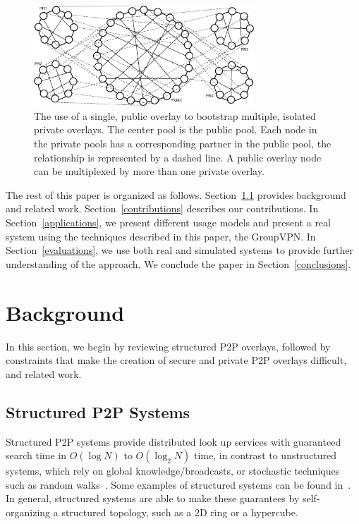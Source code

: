 \documentclass[conference]{IEEEtran}
\begin{document}
\begin{figure}[h]
\centering
\includegraphics[width=3.25in]{subrings.eps}
\caption{The use of a single, public overlay to bootstrap multiple, isolated
private overlays.  The center pool is the public pool.  Each node in the
private pools has a corresponding partner in the public pool, the relationship
is represented by a dashed line.  A public overlay node can be multiplexed by
more than one private overlay.}
\label{fig:subrings}
\end{figure}

The rest of this paper is organized as follows.  Section~\ref{structured_p2p}
provides background and related work.
Section~\ref{contributions} describes our contributions.  In
Section~\ref{applications}, we present different usage models and present a
real system using the techniques described in this paper, the GroupVPN.  In
Section~\ref{evaluations}, we use both real and simulated systems to provide
further understanding of the approach.  We conclude the paper in
Section~\ref{conclusions}.

\section{Background}
\label{background}
In this section, we begin by reviewing structured P2P overlays, followed by
constraints that make the creation of secure and private P2P overlays
difficult, and related work.

\subsection{Structured P2P Systems}
\label{structured_p2p}
Structured P2P systems provide distributed look up services with guaranteed
search time in $O(\log N)$ to $O(\log_2 N)$ time, in contrast to unstructured
systems, which rely on global knowledge/broadcasts, or stochastic techniques
such as random walks~\cite{unstructured_v_structured}.  Some examples of
structured systems can be found in~\cite{pastry, chord, symphony, kademlia,
can}.  In general, structured systems are able to make these guarantees by
self-organizing a structured topology, such as a 2D ring or a hypercube.
\end{document}
